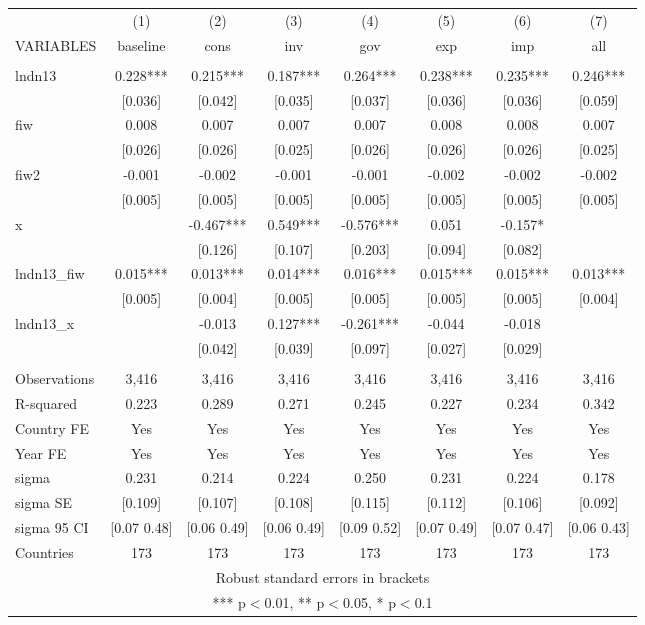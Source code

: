 \begin{tabular}{lccccccc} \hline
 & (1) & (2) & (3) & (4) & (5) & (6) & (7) \\
VARIABLES & baseline & cons & inv & gov & exp & imp & all \\ \hline
 &  &  &  &  &  &  &  \\
lndn13 & 0.228*** & 0.215*** & 0.187*** & 0.264*** & 0.238*** & 0.235*** & 0.246*** \\
 & [0.036] & [0.042] & [0.035] & [0.037] & [0.036] & [0.036] & [0.059] \\
fiw & 0.008 & 0.007 & 0.007 & 0.007 & 0.008 & 0.008 & 0.007 \\
 & [0.026] & [0.026] & [0.025] & [0.026] & [0.026] & [0.026] & [0.025] \\
fiw2 & -0.001 & -0.002 & -0.001 & -0.001 & -0.002 & -0.002 & -0.002 \\
 & [0.005] & [0.005] & [0.005] & [0.005] & [0.005] & [0.005] & [0.005] \\
x &  & -0.467*** & 0.549*** & -0.576*** & 0.051 & -0.157* &  \\
 &  & [0.126] & [0.107] & [0.203] & [0.094] & [0.082] &  \\
lndn13\_fiw & 0.015*** & 0.013*** & 0.014*** & 0.016*** & 0.015*** & 0.015*** & 0.013*** \\
 & [0.005] & [0.004] & [0.005] & [0.005] & [0.005] & [0.005] & [0.004] \\
lndn13\_x &  & -0.013 & 0.127*** & -0.261*** & -0.044 & -0.018 &  \\
 &  & [0.042] & [0.039] & [0.097] & [0.027] & [0.029] &  \\
 &  &  &  &  &  &  &  \\
Observations & 3,416 & 3,416 & 3,416 & 3,416 & 3,416 & 3,416 & 3,416 \\
R-squared & 0.223 & 0.289 & 0.271 & 0.245 & 0.227 & 0.234 & 0.342 \\
Country FE & Yes & Yes & Yes & Yes & Yes & Yes & Yes \\
Year FE & Yes & Yes & Yes & Yes & Yes & Yes & Yes \\
sigma & 0.231 & 0.214 & 0.224 & 0.250 & 0.231 & 0.224 & 0.178 \\
sigma SE & [0.109] & [0.107] & [0.108] & [0.115] & [0.112] & [0.106] & [0.092] \\
sigma 95 CI & [0.07 0.48] & [0.06 0.49] & [0.06 0.49] & [0.09 0.52] & [0.07 0.49] & [0.07 0.47] & [0.06 0.43] \\
 Countries & 173 & 173 & 173 & 173 & 173 & 173 & 173 \\ \hline
\multicolumn{8}{c}{ Robust standard errors in brackets} \\
\multicolumn{8}{c}{ *** p$<$0.01, ** p$<$0.05, * p$<$0.1} \\
\end{tabular}
